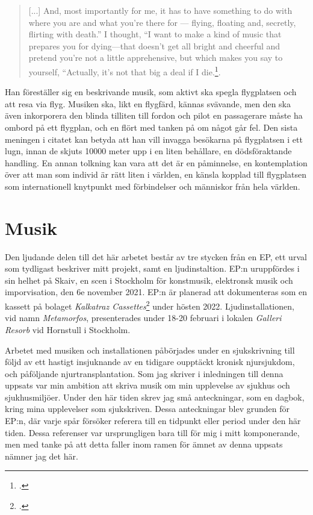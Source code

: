 \documentclass{article}
\begin{document}
\begin{quote}
[...] And, most importantly for me, it has to have
something to do with where you are and what you're there for --- flying, floating and, secretly, flirting with
death.'' I thought, ``I want to make a kind of music that prepares you for dying—that doesn’t get all bright and
cheerful and pretend you’re not a little apprehensive, but which makes you say to yourself, ``Actually, it’s
not that big a deal if I die.\footcite[152]{Eno}.
\end{quote}

Han föreställer sig en beskrivande musik, som aktivt ska spegla flygplatsen och att resa via flyg. Musiken
ska, likt en flygfärd, kännas svävande, men den ska även inkorporera den blinda tilliten till fordon och pilot
en passagerare måste ha ombord på ett flygplan, och en flört med tanken på om något går fel. Den sista meningen i
citatet kan betyda att han vill invagga besökarna på flygplatsen i ett lugn, innan de skjuts 10000 meter upp 
i en liten behållare, en dödsföraktande handling. En annan tolkning kan vara att det är en påminnelse, en
kontemplation över att man som individ är rätt liten i världen, en känsla kopplad till flygplatsen som 
internationell knytpunkt med förbindelser och människor från hela världen. 

\pagebreak
\section{Musik}
Den ljudande delen till det här arbetet består av tre stycken från en EP, ett urval som tydligast beskriver
mitt projekt, samt en ljudinstaltion. EP:n uruppfördes i sin helhet på Skaiv, en scen i Stockholm för
konstmusik, elektronsk musik och imporvisation, den 6e november 2021. EP:n är planerad att dokumenteras som en
kassett på bolaget \emph{Kalkatraz Cassettes}\footcite{kalkatraz} under hösten 2022.
Ljudinstallationen, vid namn \emph{Metamorfos}, presenterades under 18-20 februari i lokalen \emph{Galleri
Resorb} vid Hornstull i Stockholm. 

Arbetet med musiken och installationen påbörjades under en sjukskrivning till följd av ett hastigt
insjuknande av en tidigare oupptäckt kronisk njursjukdom, och påföljande njurtransplantation. Som jag skriver
i inledningen till denna uppsats var min ambition att skriva musik om min upplevelse av sjukhus och
sjukhusmiljöer. Under den här tiden skrev jag små anteckningar, som en dagbok, kring mina upplevelser som
sjukskriven. Dessa anteckningar blev grunden för EP:n, där varje spår försöker referera till en tidpunkt eller
period under den här tiden. Dessa referenser var ursprungligen bara till för mig i mitt komponerande, men med
tanke på att detta faller inom ramen för ämnet av denna uppsats nämner jag det här. 
\end{document}
